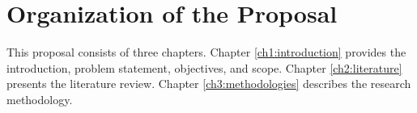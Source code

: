 \section{Organization of the Proposal}
This proposal consists of three chapters. Chapter \ref{ch1:introduction} provides the introduction, problem statement, objectives, and scope. Chapter \ref{ch2:literature} presents the literature review. Chapter \ref{ch3:methodologies} describes the research methodology.
